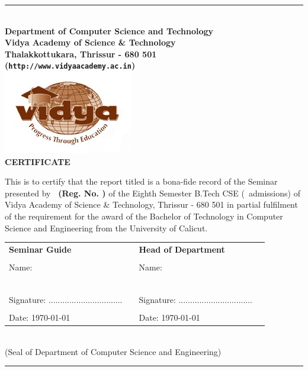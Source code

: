 
\begin{center}
\hrule
\quad\\[0.75cm]
{\Large \bf Department of Computer Science and Technology}\\
{\large \bf Vidya Academy of Science \& Technology}\\
{\normalsize \bf Thalakkottukara, Thrissur - 680 501\\
({\tt http://www.vidyaacademy.ac.in})}\\[0.5cm]
\includegraphics{VidyaLogo}\\[1.25cm]
%
{\Large \bf CERTIFICATE}\\[1cm]
%
\end{center}
This is to certify that the report titled 
{\bf \vtitle} is a bona-fide record of the 
Seminar presented by {\bf \vauthor\  
(Reg. No. \vregisternumber)}    of the Eighth 
Semester B.Tech CSE (\vadmissionyear\ admissions) 
of Vidya Academy of Science \& Technology, 
Thrissur - 680 501 in partial fulfilment of the 
requirement for the award of the Bachelor of Technology in Computer Science and Engineering from the University of 
Calicut.\\[0.1cm]
%
\begin{center}
\begin{tabular}{llll}
\multicolumn{2}{l}{\bf Seminar Guide}    
&\multicolumn{2}{l}{\bf Head of Department}   \\
   & & \\
Name: &&  Name: \\
\vguide\ && \vhod\ \\ \\
Signature: \quad  ................................
\qquad \qquad && Signature: \quad 
................................ \\
& & & \\
Date: \hspace{10mm} \today & & Date: \hspace{10mm} \today \\
\end{tabular}
\\[1cm]
{\small (Seal of Department of Computer Science and Engineering)}
\quad \\[0.75cm]
\hrule
\end{center} 
%
